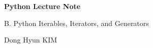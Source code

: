 \documentclass[a4paper,11pt]{article}
\begin{document}

\begin{titlepage}
    \centering
    \vspace*{\fill}

    {\Huge\bfseries Python Lecture Note\par}

    \vspace{1cm}

    {\Large B. Python Iterables, Iterators, and Generators\par}

    \vspace{0.5cm}

    {\large Dong Hyun KIM\par}

    \vspace*{\fill}
\end{titlepage}



\end{document}
